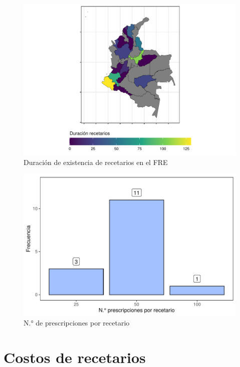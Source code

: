 \documentclass[
]{book}
\begin{document}
\begin{figure}
\includegraphics[width=0.85\linewidth]{InformeFinal_files/figure-latex/existenciaRecetarios3-1} \caption{Duración de existencia de recetarios en el FRE}\label{fig:existenciaRecetarios3}
\end{figure}

\begin{figure}
\includegraphics[width=0.85\linewidth]{InformeFinal_files/figure-latex/existenciaRecetarios4-1} \caption{N.° de prescripciones por recetario}\label{fig:existenciaRecetarios4}
\end{figure}

\hypertarget{costos-de-recetarios}{%
\section{Costos de recetarios}\label{costos-de-recetarios}}
\end{document}
